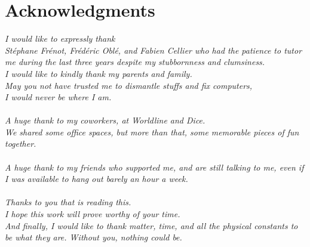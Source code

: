 
\vspace*{\fill}
\section*{Acknowledgments}
\begin{flushleft}
\noindent%
\textit{
I would like to expressly thank\\
Stéphane Frénot, Frédéric Oblé, and Fabien Cellier who had the patience to tutor me during the last three years despite my stubbornness and clumsiness.
\\[30pt]
%
I would like to kindly thank my parents and family.\\
May you not have trusted me to dismantle stuffs and fix computers,\\
I would never be where I am.\\
{}\\[30pt]
%
A huge thank to my coworkers, at Worldline and Dice.\\
We shared some office spaces, but more than that, some memorable pieces of fun together.\\
{}\\[30pt]
%
A huge thank to my friends who supported me, and are still talking to me, even if I was available to hang out barely an hour a week.\\
{}\\[30pt]
%
%
Thanks to you that is reading this.\\
I hope this work will prove worthy of your time.
\\[30pt]
%
And finally, I would like to thank matter, time, and all the physical constants to be what they are.
Without you, nothing could be.
}
\end{flushleft}
\\
\vspace*{\fill}
\eject